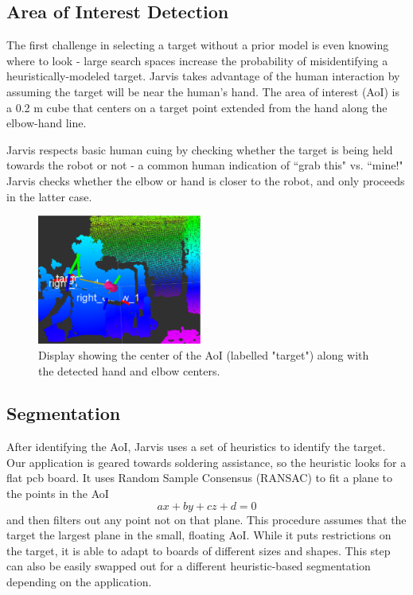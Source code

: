 \documentclass[10pt]{article}
\begin{document}
\subsection{Area of Interest Detection} \label{sec:aoi}
The first challenge in selecting a target without a prior model is even knowing where to look - large search spaces increase the probability of misidentifying a heuristically-modeled target. Jarvis takes advantage of the human interaction by assuming the target will be near the human's hand. The area of interest (AoI) is a 0.2 m cube that centers on a target point extended from the hand along the elbow-hand line.  
\par Jarvis respects basic human cuing by checking whether the target is being held towards the robot or not - a common human indication of ``grab this" vs. ``mine!" Jarvis checks whether the elbow or hand is closer to the robot, and only proceeds in the latter case. 

 \begin{figure}
\includegraphics[width=0.48\textwidth]{figures/frames.eps}  
\caption{Display showing the center of the AoI (labelled "target") along with the detected hand and elbow centers.}
\label{fig:frames}
\end{figure}
\subsection{Segmentation} \label{sec:segmentation}
After identifying the AoI, Jarvis uses a set of heuristics to identify the target. Our application is geared towards soldering assistance, so the heuristic looks for a flat pcb board. It uses Random Sample Consensus (RANSAC) to fit a plane to the points in the AoI
\begin{equation} \label{eq:plane}
ax+by+cz+d=0 
\end{equation}
 and then filters out any point not on that plane. This procedure assumes that the target the largest plane in the small, floating AoI. While it puts restrictions on the target, it is able to adapt to boards of different sizes and shapes. This step can also be easily swapped out for a different heuristic-based segmentation depending on the application.  
\end{document}

